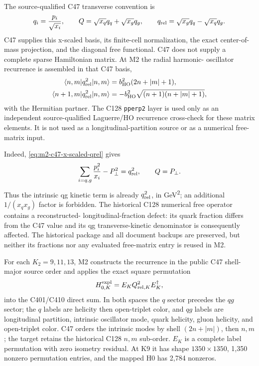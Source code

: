 \documentclass[11pt,oneside]{book}
\newcommand{\codepath}[1]{\nolinkurl{#1}}
\begin{document}
The source-qualified C47 transverse convention is
\begin{equation}
 q_i=\frac{p_i}{\sqrt{x_i}},\qquad
 Q=\sqrt{x_q}q_q+\sqrt{x_g}q_g,\qquad
 q_{\rm rel}=\sqrt{x_g}q_q-\sqrt{x_q}q_g.
 \label{eq:m2-c47-x-scaled-qrel}
\end{equation}
C47 supplies this x-scaled basis, its finite-cell normalization, the exact
center-of-mass projection, and the diagonal free functional. C47 does not
supply a complete sparse Hamiltonian matrix. At M2 the radial harmonic-
oscillator recurrence is assembled in that C47 basis,
\begin{align}
 \langle n,m|q_{\rm rel}^2|n,m\rangle
 &=b_{\rm HO}^2(2n+|m|+1),\\
 \langle n+1,m|q_{\rm rel}^2|n,m\rangle
 &=-b_{\rm HO}^2\sqrt{(n+1)(n+|m|+1)},
 \label{eq:m2-qrel-recurrence}
\end{align}
with the Hermitian partner. The C128 \codepath{pperp2} layer is used only as
an independent source-qualified Laguerre/HO recurrence cross-check for these
matrix elements. It is not used as a longitudinal-partition source or as a
numerical free-matrix input.

Indeed, \cref{eq:m2-c47-x-scaled-qrel} gives
\begin{equation}
 \sum_{i=q,g}\frac{p_i^2}{x_i}-P_\perp^2=q_{\rm rel}^2,
 \qquad Q=P_\perp.
 \label{eq:m2-qrel-intrinsic-identity}
\end{equation}
Thus the intrinsic qg kinetic term is already \(q_{\rm rel}^2\), in
\unit{GeV^2}; an additional \(1/(x_qx_g)\) factor is forbidden. The
historical C128 numerical free operator contains a reconstructed-
longitudinal-fraction defect: its quark fraction differs from the C47 value
and its qg transverse-kinetic denominator is consequently affected. The
historical package and all document backups are preserved, but neither its
fractions nor any evaluated free-matrix entry is reused in M2.

For each $K_2=9,11,13$, M2 constructs the recurrence in the public C47
shell-major source order and applies the exact square permutation
\begin{equation}
 H_{0,K}^{\rm expl}=E_K Q_{{\rm rel},K}^2 E_K^\dagger,
 \label{eq:m2-h0-permutation}
\end{equation}
into the C401/C410 direct sum. In both spaces the $q$ sector precedes the
$qg$ sector; the $q$ labels are helicity then open-triplet color, and $qg$
labels are longitudinal partition, intrinsic oscillator mode, quark helicity,
gluon helicity, and open-triplet color. C47 orders the intrinsic modes by
shell $(2n+|m|)$, then $n,m$; the target retains the historical C128 $n,m$
sub-order. $E_K$ is a complete label permutation with zero isometry residual.
At K9 it has shape $1350\times1350$, 1,350 nonzero permutation entries, and
the mapped H0 has 2,784 nonzeros.
\end{document}
